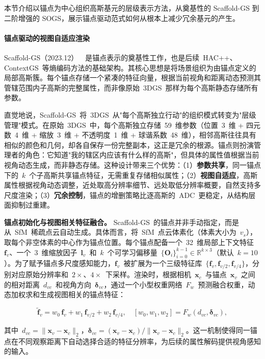 本节介绍以锚点为中心组织高斯基元的层级表示方法，从奠基性的 Scaffold-GS 到二阶增强的 SOGS，展示锚点驱动范式如何从根本上减少冗余基元的产生。

\paragraph{锚点驱动的视图自适应渲染}

Scaffold-GS（2023.12）~\cite{2312_00109}~是锚点表示的奠基性工作，也是后续~HAC++、ContextGS~等熵编码方法的基础架构。其核心思想是将场景组织为由锚点定义的局部高斯簇。每个锚点存储一个紧凑的特征向量，根据当前视角和距离动态预测其管辖范围内子高斯的完整属性，而非像原始~3DGS~那样为每个高斯静态存储所有参数。

直觉地说，Scaffold-GS~将~3DGS~从"每个高斯独立行动"的组织模式转变为"层级管理"模式。在原始~3DGS~中，每个高斯独立存储~59~维参数（位置~3~维 + 四元数~4~维 + 缩放~3~维 + 不透明度~1~维 + 球谐系数~48~维），相邻高斯往往具有相似的颜色和几何，却各自保存一份完整副本，这正是冗余的根源。锚点则扮演管理者的角色：它知道"我的辖区内应该有什么样的高斯"，但具体的属性值根据当前视角动态生成，而非静态存储。这种设计带来三个优势：（1）\textbf{参数共享}，同一锚点下的~$k$~个子高斯共享锚点特征，无需重复存储相似属性；（2）\textbf{视图自适应}，高斯属性根据视角动态调整，近处取高分辨率细节、远处取低分辨率概要，自然支持多尺度渲染；（3）\textbf{冗余控制}，锚点的增删策略比逐高斯的~ADC~更稳定，从结构层面抑制过重建。

\textbf{锚点初始化与视图相关特征融合。}
Scaffold-GS~的锚点并非手动指定，而是从~SfM~稀疏点云自动生成。具体而言，将~SfM~点云体素化（体素大小为~$v_s$），取每个非空体素的中心作为锚点位置。每个锚点配备一个~32~维局部上下文特征~$\mathbf{f}_v$、一个~3~维缩放因子~$\mathbf{l}_v$~和~$k$~个可学习偏移量~$\{\mathbf{O}_i\}_{i=0}^{k-1} \in \mathbb{R}^{k \times 3}$（默认~$k=10$）。为了赋予锚点多尺度感知能力，$\mathbf{f}_v$~被扩展为一个三级特征库~$\{\mathbf{f}_v, \mathbf{f}_{v/2}, \mathbf{f}_{v/4}\}$，分别对应原始分辨率和~$2\times$、$4\times$~下采样。渲染时，根据相机~$\mathbf{x}_c$~与锚点~$\mathbf{x}_v$~之间的相对距离~$d_{vc}$~和视角方向~$\boldsymbol{\delta}_{vc}$，通过一个小型权重网络~$F_w$~预测融合权重，动态加权求和生成视图相关的锚点特征：

\begin{equation}
\tilde{\mathbf{f}}_v = w_0 \, \mathbf{f}_v + w_1 \, \mathbf{f}_{v/2} + w_2 \, \mathbf{f}_{v/4}, \quad [w_0, w_1, w_2] = F_w(d_{vc}, \boldsymbol{\delta}_{vc}),
\end{equation}

其中~$d_{vc} = \|\mathbf{x}_v - \mathbf{x}_c\|_2$，$\boldsymbol{\delta}_{vc} = (\mathbf{x}_v - \mathbf{x}_c) / \|\mathbf{x}_v - \mathbf{x}_c\|_2$。这一机制使得同一锚点在不同观察距离下自动选择合适的特征分辨率，为后续的属性解码提供视角感知的输入。

